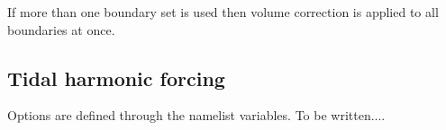\documentclass[../tex_main/NEMO_manual]{subfiles}
\begin{document}
If more than one boundary set is used then volume correction is
applied to all boundaries at once.

\newpage
\subsection{Tidal harmonic forcing}
\label{subsec:BDY_tides}



Options are defined through the   namelist variables.
 To be written....
\end{document}
